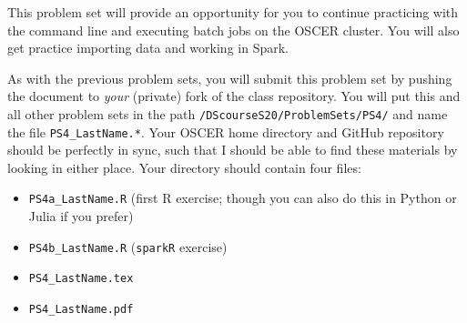 \documentclass[12pt,english]{exam}
\begin{document}
This problem set will provide an opportunity for you to continue practicing with the command line and executing batch jobs on the OSCER cluster. You will also get practice importing data and working in Spark. 

As with the previous problem sets, you will submit this problem set by pushing the document to \emph{your} (private) fork of the class repository. You will put this and all other problem sets in the path \texttt{/DScourseS20/ProblemSets/PS4/} and name the file \texttt{PS4\_LastName.*}. Your OSCER home directory and GitHub repository should be perfectly in sync, such that I should be able to find these materials by looking in either place. Your directory should contain four files:
\begin{itemize}
    \item \texttt{PS4a\_LastName.R} (first R exercise; though you can also do this in Python or Julia if you prefer)
    \item \texttt{PS4b\_LastName.R} (\texttt{sparkR} exercise)
    \item \texttt{PS4\_LastName.tex}
    \item \texttt{PS4\_LastName.pdf}
\end{itemize}
\end{document}
